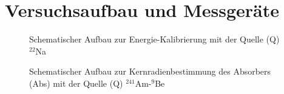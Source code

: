\section{Versuchsaufbau und Messgeräte}
\begin{figure}[htbp]  
     
  \caption{Schematischer Aufbau zur Energie-Kalibrierung mit der Quelle (Q) $^{22}$Na}
  \label{aufbau1}
\end{figure}

\begin{figure}[htbp]  
     
  \caption{Schematischer Aufbau zur Kernradienbestimmung des Absorbers (Abs) mit der Quelle (Q) $^{241}$Am-$^9$Be}
  \label{aufbau2}
\end{figure}
